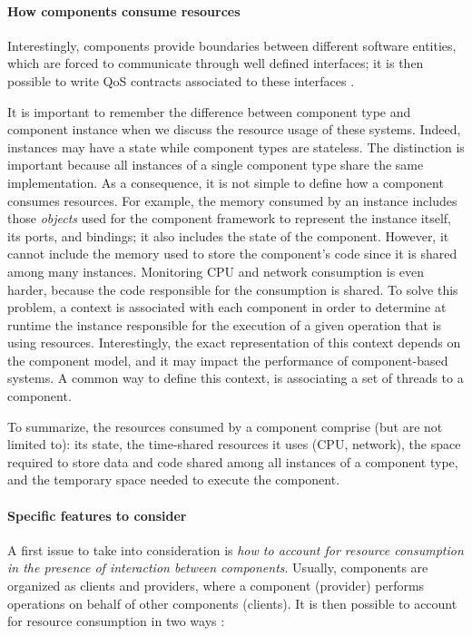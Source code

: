 \paragraph{How components consume resources}
Interestingly, components provide boundaries between different software entities, which are forced to communicate through well defined interfaces; it is then possible to write QoS contracts associated to these interfaces \cite{Beugnard774917}.

It is important to remember the difference between component type and component instance when we discuss the resource usage of these systems.
Indeed, instances may have a state while component types are stateless.
The distinction is important because all instances of a single component type share the same implementation.
As a consequence, it is not simple to define how a component consumes resources.
For example, the memory consumed by an instance includes those \textit{objects} used for the component framework to represent the instance itself, its ports, and bindings; it also includes the state of the component. 
However, it cannot include the memory used to store the component's code since it is shared among many instances.
Monitoring CPU and network consumption is even harder, because the code responsible for the consumption is shared.
To solve this problem, a context is associated with each component in order to determine at runtime the instance responsible for the execution of a given operation that is using resources.
Interestingly, the exact representation of this context depends on the component model, and it may impact the performance of component-based systems.
A common way to define this context, is associating a set of threads to a component.

To summarize, the resources consumed by a component comprise (but are not limited to): its state, the time-shared resources it uses (CPU, network), the space required to store data and code shared among all instances of a component type, and the temporary space needed to execute the component.       

\paragraph{Specific features to consider}
A first issue to take into consideration is \textit{how to account for resource consumption in the presence of interaction between components}.
Usually, components are organized as clients and providers, where a component (provider) performs operations on behalf of other components (clients).
It is then possible to account for resource consumption in two ways \cite{Miettinen2008,Maurel:2012:AME:2304736.2304763}:

